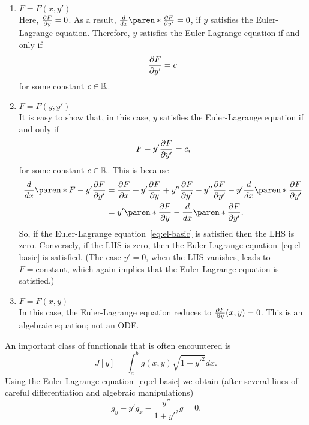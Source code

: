 \documentclass[11pt]{penrose}
\begin{document}
\begin{enumerate}
    \item $F = F(x,y')$\\
    Here, $\frac{\partial F}{\partial y} = 0$. As a result, $\frac{d}{dx} \paren*{\frac{\pd F}{\pd y'}} = 0$, if $y$ satisfies the Euler-Lagrange equation. Therefore, $y$ satisfies the Euler-Lagrange equation if and only if
    \begin{equation}
        \frac{\partial F}{\partial y'} = c
        \label{eq:first-integral-y}
    \end{equation}
    for some constant $c \in \mathbb{R}$.

    \item $F = F(y,y')$\\
    It is easy to show that, in this case, $y$ satisfies the Euler-Lagrange equation if and only if
    \begin{equation}
        F - y' \frac{\partial F}{\partial y'} = c,
        \label{eq:first-integral-x}
    \end{equation}
    for some constant $c \in \mathbb{R}$. This is because
    \begin{align}
        \frac{d}{dx} \paren*{ F - y' \frac{\pd F}{\pd y'} }
        &= \frac{\pd F}{\pd x} + y' \frac{\pd F}{\pd y} + y'' \frac{\pd F}{\pd y'} - y'' \frac{\pd F}{\pd y'} - y' \frac{d}{dx} \paren*{\frac{\pd F}{\pd y'}}\\
        &= y' \paren*{ \frac{\pd F}{\pd y} - \frac{d}{dx} \paren*{\frac{\pd F}{\pd y'}} }.
    \end{align}
    So, if the Euler-Lagrange equation~\eqref{eq:el-basic} is satisfied then the LHS is zero. Conversely, if the LHS is zero, then the Euler-Lagrange equation~\eqref{eq:el-basic} is satisfied. (The case $y' = 0$, when the LHS vanishes, leads to $F = \text{constant}$, which again implies that the Euler-Lagrange equation is satisfied.)

    \item $F = F(x,y)$\\
    In this case, the Euler-Lagrange equation reduces to $\frac{\partial F}{\partial y} (x,y) = 0$. This is an algebraic equation; not an ODE.
\end{enumerate}

An important class of functionals that is often encountered is
\begin{equation}
    J[y] = \int_{a}^{b} g(x,y) \sqrt{1 + y'^2} dx.
\end{equation}
Using the Euler-Lagrange equation~\eqref{eq:el-basic} we obtain (after several lines of careful differentiation and algebraic manipulations)
\begin{equation}
    g_y - y' g_x - \frac{y''}{1 + y'^2} g = 0.
\end{equation}
\end{document}
